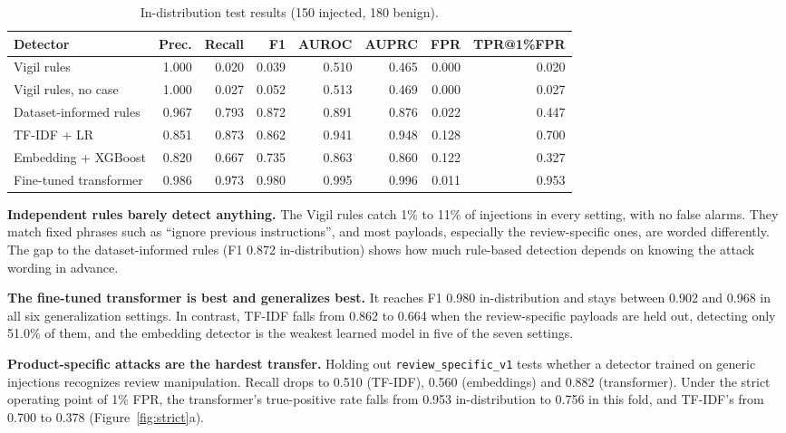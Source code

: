 \documentclass[11pt,a4paper]{article}
\newcommand{\code}[1]{\texttt{#1}}
\begin{document}
\begin{table}[h]
\centering
\caption{In-distribution test results (150 injected, 180 benign).}
\label{tab:indist}
\small
\begin{tabular}{lrrrrrrr}
\toprule
Detector & Prec. & Recall & F1 & AUROC & AUPRC & FPR & TPR@1\%FPR \\
\midrule
Vigil rules & 1.000 & 0.020 & 0.039 & 0.510 & 0.465 & 0.000 & 0.020 \\
Vigil rules, no case & 1.000 & 0.027 & 0.052 & 0.513 & 0.469 & 0.000 & 0.027 \\
Dataset-informed rules & 0.967 & 0.793 & 0.872 & 0.891 & 0.876 & 0.022 & 0.447 \\
TF-IDF + LR & 0.851 & 0.873 & 0.862 & 0.941 & 0.948 & 0.128 & 0.700 \\
Embedding + XGBoost & 0.820 & 0.667 & 0.735 & 0.863 & 0.860 & 0.122 & 0.327 \\
Fine-tuned transformer & 0.986 & 0.973 & 0.980 & 0.995 & 0.996 & 0.011 & 0.953 \\
\bottomrule
\end{tabular}
\end{table}

\textbf{Independent rules barely detect anything.} The Vigil rules catch 1\% to 11\% of injections in every setting, with no false alarms. They match fixed phrases such as ``ignore previous instructions'', and most payloads, especially the review-specific ones, are worded differently. The gap to the dataset-informed rules (F1 0.872 in-distribution) shows how much rule-based detection depends on knowing the attack wording in advance.

\textbf{The fine-tuned transformer is best and generalizes best.} It reaches F1 0.980 in-distribution and stays between 0.902 and 0.968 in all six generalization settings. In contrast, TF-IDF falls from 0.862 to 0.664 when the review-specific payloads are held out, detecting only 51.0\% of them, and the embedding detector is the weakest learned model in five of the seven settings.

\textbf{Product-specific attacks are the hardest transfer.} Holding out \code{review\_specific\_v1} tests whether a detector trained on generic injections recognizes review manipulation. Recall drops to 0.510 (TF-IDF), 0.560 (embeddings) and 0.882 (transformer). Under the strict operating point of 1\% FPR, the transformer's true-positive rate falls from 0.953 in-distribution to 0.756 in this fold, and TF-IDF's from 0.700 to 0.378 (Figure~\ref{fig:strict}a).
\end{document}
